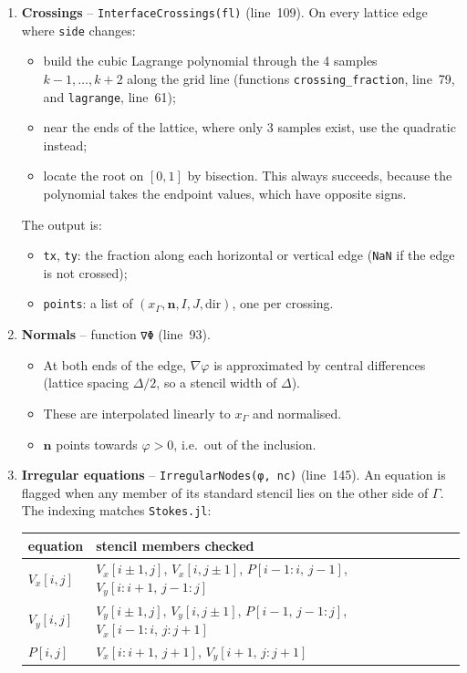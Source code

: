 \documentclass[11pt,a4paper]{article}
\newcommand{\code}[1]{\texttt{#1}}
\begin{document}
\begin{enumerate}[leftmargin=*]
\item \textbf{Crossings} -- \code{InterfaceCrossings(fl)} (line~109).
  On every lattice edge where \code{side} changes:
  \begin{itemize}
    \item build the cubic Lagrange polynomial through the 4 samples $k-1,\dots,k+2$ along the
      grid line (functions \code{crossing\_fraction}, line~79, and \code{lagrange}, line~61);
    \item near the ends of the lattice, where only 3 samples exist, use the quadratic instead;
    \item locate the root on $[0,1]$ by bisection. This always succeeds, because the
      polynomial takes the endpoint values, which have opposite signs.
  \end{itemize}
  The output is:
  \begin{itemize}
    \item \code{tx}, \code{ty}: the fraction along each horizontal or vertical edge
      (\code{NaN} if the edge is not crossed);
    \item \code{points}: a list of $(x_\Gamma,\mathbf n,I,J,\text{dir})$, one per crossing.
  \end{itemize}

\item \textbf{Normals} -- function \code{∇Φ} (line~93).
  \begin{itemize}
    \item At both ends of the edge, $\nabla\varphi$ is approximated by central differences
      (lattice spacing $\Delta/2$, so a stencil width of $\Delta$).
    \item These are interpolated linearly to $x_\Gamma$ and normalised.
    \item $\mathbf n$ points towards $\varphi>0$, i.e.\ out of the inclusion.
  \end{itemize}

\item \textbf{Irregular equations} -- \code{IrregularNodes(φ, nc)} (line~145).
  An equation is flagged when any member of its standard stencil lies on the other side of
  $\Gamma$. The indexing matches \code{Stokes.jl}:
  \begin{center}
  \begin{tabular}{@{}ll@{}}
    \toprule
    equation & stencil members checked \\
    \midrule
    $V_x[i,j]$ & $V_x[i\pm1,j]$, $V_x[i,j\pm1]$, $P[i-1{:}i,\,j-1]$, $V_y[i{:}i+1,\,j-1{:}j]$ \\
    $V_y[i,j]$ & $V_y[i\pm1,j]$, $V_y[i,j\pm1]$, $P[i-1,\,j-1{:}j]$, $V_x[i-1{:}i,\,j{:}j+1]$ \\
    $P[i,j]$ & $V_x[i{:}i+1,\,j+1]$, $V_y[i+1,\,j{:}j+1]$ \\
    \bottomrule
  \end{tabular}
  \end{center}


\end{enumerate}
\end{document}
